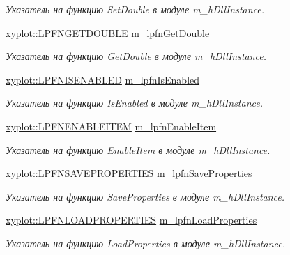 \begin{DoxyCompactItemize}
\begin{DoxyCompactList}\small\item\em Указатель на функцию Set\-Double в модуле m\-\_\-h\-Dll\-Instance. \end{DoxyCompactList}\item 
\hyperlink{namespacexyplot_ada339f0f5dd59a8edbeb5462b404b412}{xyplot\-::\-L\-P\-F\-N\-G\-E\-T\-D\-O\-U\-B\-L\-E} \hyperlink{group__gr_func_pointers_gac1a94a046cfcf628aa6692941a206adc}{m\-\_\-lpfn\-Get\-Double}
\begin{DoxyCompactList}\small\item\em Указатель на функцию Get\-Double в модуле m\-\_\-h\-Dll\-Instance. \end{DoxyCompactList}\item 
\hyperlink{namespacexyplot_a2b24ec8edd78c631d7576e9e0804bd3b}{xyplot\-::\-L\-P\-F\-N\-I\-S\-E\-N\-A\-B\-L\-E\-D} \hyperlink{group__gr_func_pointers_ga2fdbebbf63a4c3cd16bbf660614f18c0}{m\-\_\-lpfn\-Is\-Enabled}
\begin{DoxyCompactList}\small\item\em Указатель на функцию Is\-Enabled в модуле m\-\_\-h\-Dll\-Instance. \end{DoxyCompactList}\item 
\hyperlink{namespacexyplot_adc713064c472b328718bae52d4a28eb5}{xyplot\-::\-L\-P\-F\-N\-E\-N\-A\-B\-L\-E\-I\-T\-E\-M} \hyperlink{group__gr_func_pointers_ga421533a2bc619d310d3d15ea0e711e2e}{m\-\_\-lpfn\-Enable\-Item}
\begin{DoxyCompactList}\small\item\em Указатель на функцию Enable\-Item в модуле m\-\_\-h\-Dll\-Instance. \end{DoxyCompactList}\item 
\hyperlink{namespacexyplot_a097f19903e90904e363a37bd0418d16b}{xyplot\-::\-L\-P\-F\-N\-S\-A\-V\-E\-P\-R\-O\-P\-E\-R\-T\-I\-E\-S} \hyperlink{group__gr_func_pointers_ga74b37df4630a8a23c0751467389449c7}{m\-\_\-lpfn\-Save\-Properties}
\begin{DoxyCompactList}\small\item\em Указатель на функцию Save\-Properties в модуле m\-\_\-h\-Dll\-Instance. \end{DoxyCompactList}\item 
\hyperlink{namespacexyplot_a5fcef3c2ef35e0f543cb6e0489566a41}{xyplot\-::\-L\-P\-F\-N\-L\-O\-A\-D\-P\-R\-O\-P\-E\-R\-T\-I\-E\-S} \hyperlink{group__gr_func_pointers_ga13af71d79b02970b7d7c78d148b7fb3e}{m\-\_\-lpfn\-Load\-Properties}
\begin{DoxyCompactList}\small\item\em Указатель на функцию Load\-Properties в модуле m\-\_\-h\-Dll\-Instance. \end{DoxyCompactList}\item 

\end{DoxyCompactItemize}
